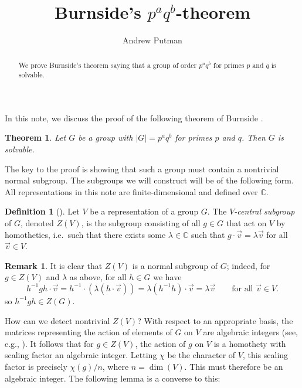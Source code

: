 \documentclass[11pt]{article}
\title{\vspace{-50pt}Burnside's $p^a q^b$-theorem}
\author{Andrew Putman\vspace{-6pt}}
\date{}
\numberwithin{equation}{section}
\theoremstyle{plain}
\newtheorem{maintheorem}{Theorem}
\theoremstyle{definition}
\newtheorem{defn}[theorem]{Definition}
\newenvironment{definition}[1][]{\begin{defn}[#1]\pushQED{\qed}}{\popQED \end{defn}}
\newtheorem*{remark}{Remark}
\newcommand\C{\ensuremath{\mathbb{C}}}
\begin{document}
\maketitle

\begin{abstract}
We prove Burnside's theorem saying that a group of order $p^a q^b$ for primes $p$ and $q$ is solvable.
\end{abstract}

In this note, we discuss the proof of the following theorem of Burnside \cite{Burnside}.

\begin{maintheorem}
\label{theorem:burnside}
Let $G$ be a group with $|G| = p^a q^b$ for primes $p$ and $q$.  Then $G$ is solvable.
\end{maintheorem}

\noindent
The key to the proof is showing that such a group must contain a nontrivial normal subgroup.
The subgroups we will construct will be of the following form.  All representations in
this note are finite-dimensional and defined over $\C$.

\begin{definition}
Let $V$ be a representation of a group $G$.  The {\em $V$-central subgroup} of $G$, denoted
$Z(V)$, is the subgroup consisting of all $g \in G$ that act on $V$ by homotheties, i.e.\ such that
there exists some $\lambda \in \C$ such that $g \cdot \vec{v} = \lambda \vec{v}$ for all
$\vec{v} \in V$.
\end{definition}

\begin{remark}
It is clear that $Z(V)$ is a normal subgroup of $G$; indeed, for $g \in Z(V)$ and $\lambda$ as above, for
all $h \in G$ we have
\[h^{-1} g h \cdot \vec{v} = h^{-1} \cdot (\lambda (h \cdot \vec{v})) = \lambda (h^{-1} h) \cdot \vec{v} = \lambda \vec{v} \quad \quad \text{for all $\vec{v} \in V$}.\]
so $h^{-1} g h \in Z(G)$.
\end{remark}

How can we detect nontrivial $Z(V)$?  With respect to an appropriate basis, the matrices
representing the action of elements of $G$ on $V$ are algebraic integers (see, e.g., 
\cite{PutmanAlg}).  It follows that for
$g \in Z(V)$, the action of $g$ on $V$ is a homothety with scaling factor an algebraic integer.  Letting
$\chi$ be the character of $V$, this scaling factor is precisely $\chi(g)/n$, where $n = \dim(V)$.  This must
therefore be an algebraic integer.  The following lemma is a converse to this:
\end{document}
